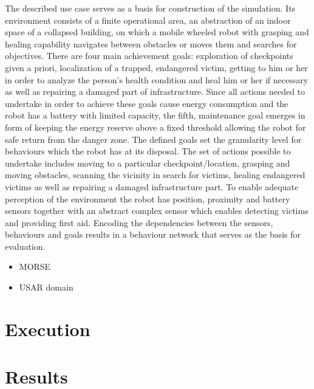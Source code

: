 \par The described use case serves as a basis for construction of the simulation. Its environment consists of a finite operational area, an abstraction of an indoor space of a collapsed building, on which a mobile wheeled robot with grasping and healing capability navigates between obstacles or moves them and searches for objectives. There are four main achievement goals: exploration of checkpoints given a priori, localization of a trapped, endangered victim, getting to him or her in order to analyze the person's health condition and heal him or her if necessary as well as repairing a damaged part of infrastructure. Since all actions needed to undertake in order to achieve these goals cause energy consumption and the robot has a battery with limited capacity, the fifth, maintenance goal emerges in form of keeping the energy reserve above a fixed threshold allowing the robot for safe return from the danger zone. The defined goals set the granularity level for behaviours which the robot has at its disposal. The set of actions possible to undertake includes moving to a particular checkpoint/location, grasping and moving obstacles, scanning the vicinity in search for victims, healing endangered victims as well as repairing a damaged infrastructure part. To enable adequate perception of the environment the robot has position, proximity and battery sensors together with an abstract complex sensor which enables detecting victims and providing first aid. Encoding the dependencies between the sensors, behaviours and goals results in a behaviour network that serves as the basis for evaluation.
\begin{itemize}
    \item MORSE
    \item USAR domain
\end{itemize}
\section{Execution}

\section{Results}